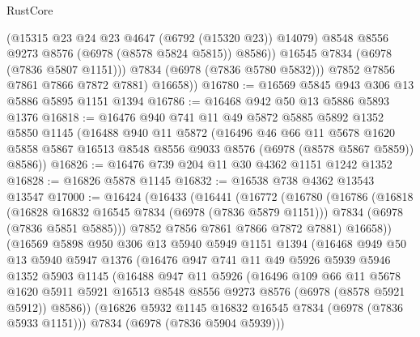 \begin{lexlean}{RustCore}
\begin{coremodule}
                  (@15315 @23 @24 @23 @4647 (@6792 (@15320 @23)) @14079)
                  @8548
                  @8556
                  @9273
                  @8576
                  (@6978 (@8578 @5824 @5815))
                  @8586))
              @16545
              @7834
              (@6978 (@7836 @5807 @1151)))
            @7834
            (@6978 (@7836 @5780 @5832)))
          @7852
          @7856
          @7861
          @7866
          @7872
          @7881)
        @16658))
@16780 := @16569 @5845 @943 @306 @13 @5886 @5895 @1151 @1394
@16786 := @16468 @942 @50 @13 @5886 @5893 @1376
@16818 := @16476
    @940
    @741
    @11
    @49
    @5872
    @5885
    @5892
    @1352
    @5850
    @1145
    (@16488
      @940
      @11
      @5872
      (@16496
        @46
        @66
        @11
        @5678
        @1620
        @5858
        @5867
        @16513
        @8548
        @8556
        @9033
        @8576
        (@6978 (@8578 @5867 @5859))
        @8586))
@16826 := @16476 @739 @204 @11 @30 @4362 @1151 @1242 @1352
@16828 := @16826 @5878 @1145
@16832 := @16538 @738 @4362 @13543 @13547
@17000 := @16424
    (@16433
      (@16441
        (@16772
          (@16780
            (@16786
              (@16818
                (@16828 @16832 @16545 @7834 (@6978 (@7836 @5879 @1151)))
                @7834
                (@6978 (@7836 @5851 @5885)))
              @7852
              @7856
              @7861
              @7866
              @7872
              @7881)
            @16658))
        (@16569
          @5898
          @950
          @306
          @13
          @5940
          @5949
          @1151
          @1394
          (@16468
            @949
            @50
            @13
            @5940
            @5947
            @1376
            (@16476
              @947
              @741
              @11
              @49
              @5926
              @5939
              @5946
              @1352
              @5903
              @1145
              (@16488
                @947
                @11
                @5926
                (@16496
                  @109
                  @66
                  @11
                  @5678
                  @1620
                  @5911
                  @5921
                  @16513
                  @8548
                  @8556
                  @9273
                  @8576
                  (@6978 (@8578 @5921 @5912))
                  @8586))
              (@16826 @5932 @1145 @16832 @16545 @7834 (@6978 (@7836 @5933 @1151)))
              @7834
              (@6978 (@7836 @5904 @5939)))

\end{coremodule}
\end{lexlean}
